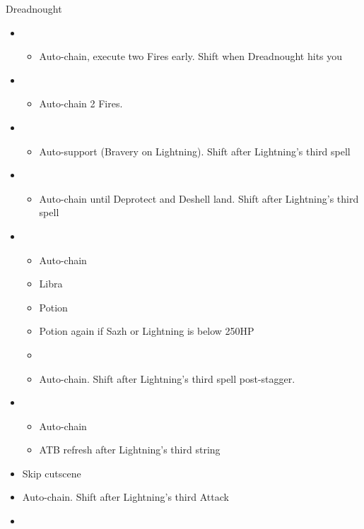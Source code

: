 \begin{battle}[2:16]{Dreadnought}
	\begin{multicols}{2}
		\begin{itemize}
			\item \fourth
			      \begin{itemize}
				      \item Auto-chain, execute two Fires early. Shift when Dreadnought hits you
			      \end{itemize}
			\item \fifth
			      \begin{itemize}
				      \item Auto-chain 2 Fires.
			      \end{itemize}
			\item \sixth
			      \begin{itemize}
				      \item Auto-support (Bravery on Lightning). Shift after Lightning’s third spell
			      \end{itemize}
			\item \fourth
			      \begin{itemize}
				      \item Auto-chain until Deprotect and Deshell land. Shift after Lightning’s third spell
			      \end{itemize}
			\item \fifth
			      \begin{itemize}
				      \item Auto-chain
				      \item Libra
				      \item Potion
				      \item Potion again if Sazh or Lightning is below 250HP
				      \item \stagger
				      \item Auto-chain. Shift after Lightning’s third spell post-stagger.
			      \end{itemize}
			\item \first
			      \begin{itemize}
				      \item Auto-chain
				      \item ATB refresh after Lightning's third string
			      \end{itemize}
			\item Skip cutscene
			      \columnbreak
			\item Auto-chain. Shift after Lightning’s third Attack
			\item \sixth

\end{itemize}
\end{multicols}
\end{battle}
